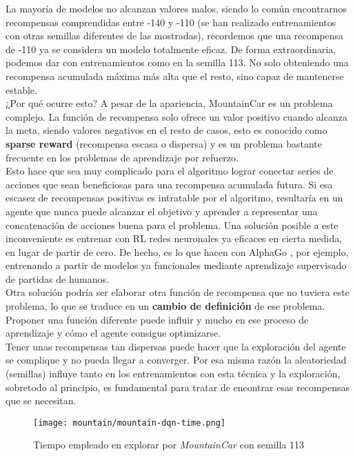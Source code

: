 \documentclass[11pt,fleqn]{book} %
\begin{document}
La mayoría de modelos no alcanzan valores malos, siendo lo común encontrarnos recompensas comprendidas entre -140 y -110 (se han realizado entrenamientos con otras semillas diferentes de las mostradas), recordemos que una recompensa de -110 ya se considera un modelo totalmente eficaz. De forma extraordinaria, podemos dar con entrenamientos como en la semilla 113. No solo obteniendo una recompensa acumulada máxima más alta que el resto, sino capaz de mantenerse estable. \\

¿Por qué ocurre esto? A pesar de la apariencia, MountainCar es un problema complejo. La función de recompensa solo ofrece un valor positivo cuando alcanza la meta, siendo valores negativos en el resto de casos, esto es conocido como \textbf{sparse reward} (recompensa escasa o dispersa) y es un problema bastante frecuente en los problemas de aprendizaje por refuerzo. \cite{article:sparse} \\

Esto hace que sea muy complicado para el algoritmo lograr conectar series de acciones que sean beneficiosas para una recompensa acumulada futura. Si esa escasez de recompensas positivas es intratable por el algoritmo, resultaría en un agente que nunca puede alcanzar el objetivo y aprender a representar una concatenación de acciones buena para el problema. Una solución posible a este inconveniente es entrenar con RL redes neuronales ya eficaces en cierta medida, en lugar de partir de cero. De hecho, es lo que hacen con AlphaGo \cite{book:alphago}, por ejemplo, entrenando a partir de modelos ya funcionales mediante aprendizaje supervisado de partidas de humanos. \\

Otra solución podría ser elaborar otra función de recompensa que no tuviera este problema, lo que se traduce en un \textbf{cambio de definición} de ese problema. Proponer una función diferente puede influir y mucho en ese proceso de aprendizaje y cómo el agente consigue optimizarse. \\

Tener unas recompensas tan dispersas puede hacer que la exploración del agente se complique y no pueda llegar a converger. Por esa misma razón la aleatoriedad (semillas) influye tanto en los entrenamientos con esta técnica y la exploración, sobretodo al principio, es fundamental para tratar de encontrar esas recompensas que se necesitan. \\

\begin{figure}[H]
	\centering\texttt{[image: mountain/mountain-dqn-time.png]}
	\caption{Tiempo empleado en explorar por \textit{MountainCar} con semilla 113}
	\label{fig:mountainDQNtime} %
\end{figure} 
\end{document}
